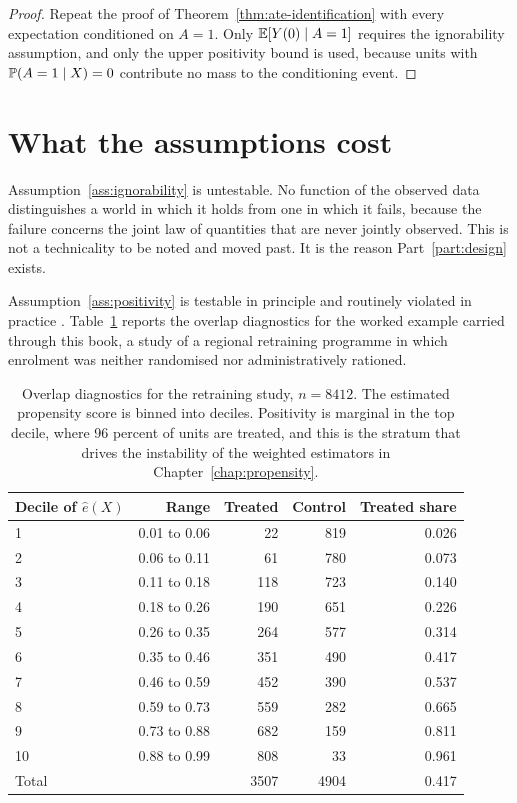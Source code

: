\begin{proof}
Repeat the proof of Theorem~\ref{thm:ate-identification} with every expectation
conditioned on $A = 1$. Only $\mathbb{E}[Y(0) \mid A = 1]$ requires the ignorability
assumption, and only the upper positivity bound is used, because units with
$\mathbb{P}(A = 1 \mid X) = 0$ contribute no mass to the conditioning event.
\end{proof}

\section{What the assumptions cost}
\label{sec:po-cost}

Assumption~\ref{ass:ignorability} is untestable. No function of the observed
data distinguishes a world in which it holds from one in which it fails, because
the failure concerns the joint law of quantities that are never jointly
observed. This is not a technicality to be noted and moved past. It is the
reason Part~\ref{part:design} exists.

Assumption~\ref{ass:positivity} is testable in principle and routinely violated
in practice \citep{ferreiro2012positivity}. Table~\ref{tab:overlap} reports the overlap diagnostics for the
worked example carried through this book, a study of a regional retraining
programme in which enrolment was neither randomised nor administratively
rationed.

\begin{table}[t]
\centering
\caption[Overlap diagnostics for the retraining study]{Overlap diagnostics for
the retraining study, $n = 8412$. The estimated propensity score is binned into
deciles. Positivity is marginal in the top decile, where 96 percent of units are
treated, and this is the stratum that drives the instability of the weighted
estimators in Chapter~\ref{chap:propensity}.}
\label{tab:overlap}
\begin{tabular}{lrrrr}
\toprule
Decile of $\hat{e}(X)$ & Range & Treated & Control & Treated share \\
\midrule
1  & 0.01 to 0.06 & 22  & 819 & 0.026 \\
2  & 0.06 to 0.11 & 61  & 780 & 0.073 \\
3  & 0.11 to 0.18 & 118 & 723 & 0.140 \\
4  & 0.18 to 0.26 & 190 & 651 & 0.226 \\
5  & 0.26 to 0.35 & 264 & 577 & 0.314 \\
6  & 0.35 to 0.46 & 351 & 490 & 0.417 \\
7  & 0.46 to 0.59 & 452 & 390 & 0.537 \\
8  & 0.59 to 0.73 & 559 & 282 & 0.665 \\
9  & 0.73 to 0.88 & 682 & 159 & 0.811 \\
10 & 0.88 to 0.99 & 808 &  33 & 0.961 \\
\midrule
Total & & 3507 & 4904 & 0.417 \\
\bottomrule
\end{tabular}
\end{table}

